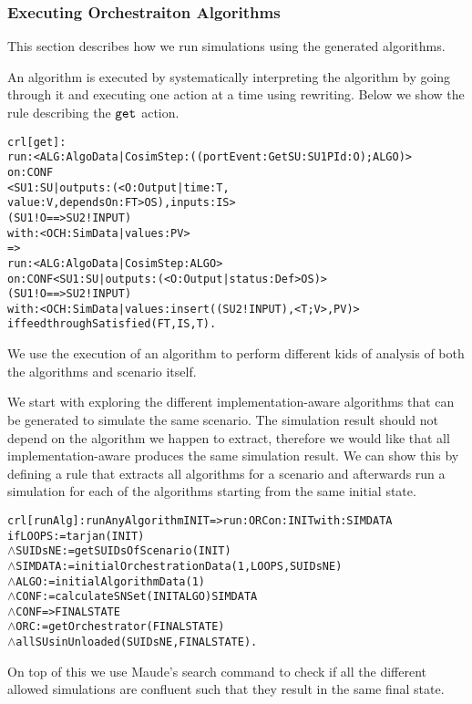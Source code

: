 \subsubsection{Executing Orchestraiton Algorithms}
This section describes how we run simulations using the generated algorithms.

An algorithm is executed by systematically interpreting the algorithm by going through it and executing one action at a time using rewriting.
Below we show the rule describing the $\mathtt{get}_{}$ action.
\begin{alltt}
\small
crl [get] : 
run: < ALG : AlgoData | CosimStep : ((portEvent: Get SU: SU1 PId: O) ; ALGO) >
on: CONF
    < SU1 : SU | outputs : (< O : Output | time : T, 
value : V, dependsOn : FT > OS), inputs : IS > 
    ( SU1 ! O ==> SU2 ! INPUT)
with: < OCH : SimData | values : PV >
=> 
run: < ALG : AlgoData | CosimStep : ALGO >
on: CONF < SU1 : SU | outputs : (< O : Output | status : Def > OS) > 
            ( SU1 ! O ==> SU2 ! INPUT)
with: < OCH : SimData | values : insert((SU2 ! INPUT), < T ; V >, PV) > 
if feedthroughSatisfied(FT, IS, T) .
\end{alltt}

We use the execution of an algorithm to perform different kids of analysis of both the algorithms and scenario itself.

We start with exploring the different implementation-aware algorithms that can be generated to simulate the same scenario.
The simulation result should not depend on the algorithm we happen to extract, therefore we would like that all implementation-aware produces the same simulation result.
We can show this by defining a rule that extracts all algorithms for a scenario and afterwards run a simulation for each of the algorithms starting from the same initial state.

\begin{alltt}
  \small
crl [runAlg] : runAnyAlgorithm INIT => run: ORC on: INIT with: SIMDATA
  if LOOPS := tarjan(INIT)
  \(\land\) SUIDsNE := getSUIDsOfScenario(INIT)
  \(\land\) SIMDATA := initialOrchestrationData(1,LOOPS,SUIDsNE)
  \(\land\) ALGO := initialAlgorithmData(1)
  \(\land\) CONF := calculateSNSet(INIT ALGO) SIMDATA 
  \(\land\) {CONF} => { FINALSTATE } 
  \(\land\) ORC := getOrchestrator(FINALSTATE)
  \(\land\) allSUsinUnloaded(SUIDsNE, FINALSTATE) .
\end{alltt}

On top of this we use Maude's search command to check if all the different allowed simulations are confluent such that they result in the same final state.

